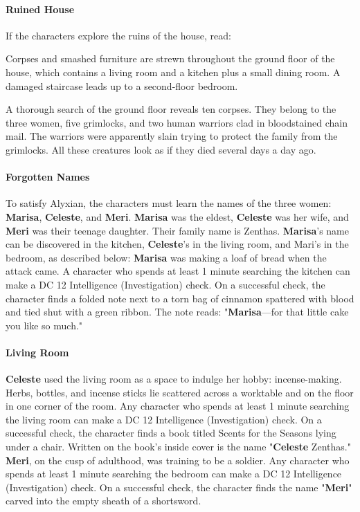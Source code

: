 \documentclass[10pt,a4,twoside,twocolumn,openany,nodeprecatedcode]{dndbook}
\begin{document}
\paragraph{Ruined House}
If the characters explore the ruins of the house, read:
\begin{DndReadAloud}{}
Corpses and smashed furniture are strewn throughout the ground floor of the house, which contains a living room and a kitchen plus a small dining room. A damaged staircase leads up to a second-floor bedroom.
\end{DndReadAloud}

A thorough search of the ground floor reveals ten corpses. They belong to the three women, five grimlocks, and two human warriors clad in bloodstained chain mail. The warriors were apparently slain trying to protect the family from the grimlocks. All these creatures look as if they died several days a day ago.
\paragraph{Forgotten Names}
To satisfy Alyxian, the characters must learn the names of the three women: \textbf{Marisa}, \textbf{Celeste}, and \textbf{Meri}. \textbf{Marisa} was the eldest, \textbf{Celeste} was her wife, and \textbf{Meri} was their teenage daughter. Their family name is Zenthas. \textbf{Marisa}'s name can be discovered in the kitchen, \textbf{Celeste}'s in the living room, and Mari's in the bedroom, as described below:
{{\textbf{Marisa} was making a loaf of bread when the attack came. A character who spends at least 1 minute searching the kitchen can make a DC 12 Intelligence (Investigation) check. On a successful check, the character finds a folded note next to a torn bag of cinnamon spattered with blood and tied shut with a green ribbon. The note reads: "\textbf{Marisa}—for that little cake you like so much."}}
\paragraph{Living Room}
\textbf{Celeste} used the living room as a space to indulge her hobby: incense-making. Herbs, bottles, and incense sticks lie scattered across a worktable and on the floor in one corner of the room. Any character who spends at least 1 minute searching the living room can make a DC 12 Intelligence (Investigation) check. On a successful check, the character finds a book titled Scents for the Seasons lying under a chair. Written on the book's inside cover is the name "\textbf{Celeste} Zenthas."
{{\textbf{Meri}, on the cusp of adulthood, was training to be a soldier. Any character who spends at least 1 minute searching the bedroom can make a DC 12 Intelligence (Investigation) check. On a successful check, the character finds the name "\textbf{Meri}" carved into the empty sheath of a shortsword.}}
\end{document}

